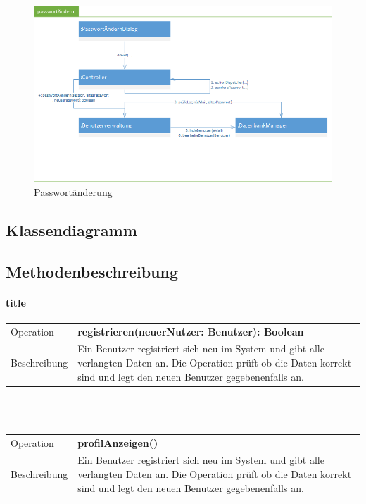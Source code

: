 \documentclass[12pt,a4paper]{article}
\begin{document}
\begin{figure}[H]
\centering
\includegraphics[width=0.7\linewidth]{Bilder/Kommunikationsdiagramme/passwortAendern}
\caption{Passwortänderung}
\label{Passwortaenderung}
\end{figure}




\subsection{Klassendiagramm}


\subsection{Methodenbeschreibung}


\paragraph{title}

\begin{tabular}{|lp{12cm}|}
			\hline
			Operation &  \textbf{registrieren(neuerNutzer: Benutzer): Boolean }\\ 
			Beschreibung & Ein Benutzer registriert sich neu im System und gibt alle verlangten Daten an. Die Operation prüft ob die Daten korrekt sind und legt den neuen Benutzer gegebenenfalls an.\\ 
			\hline 
\end{tabular} \\\\


\begin{tabular}{|lp{12cm}|}
	\hline
	Operation &  \textbf{profilAnzeigen() }\\ 
	Beschreibung & Ein Benutzer registriert sich neu im System und gibt alle verlangten Daten an. Die Operation prüft ob die Daten korrekt sind und legt den neuen Benutzer gegebenenfalls an.\\ 
	\hline 
\end{tabular} \\\\
\end{document}
